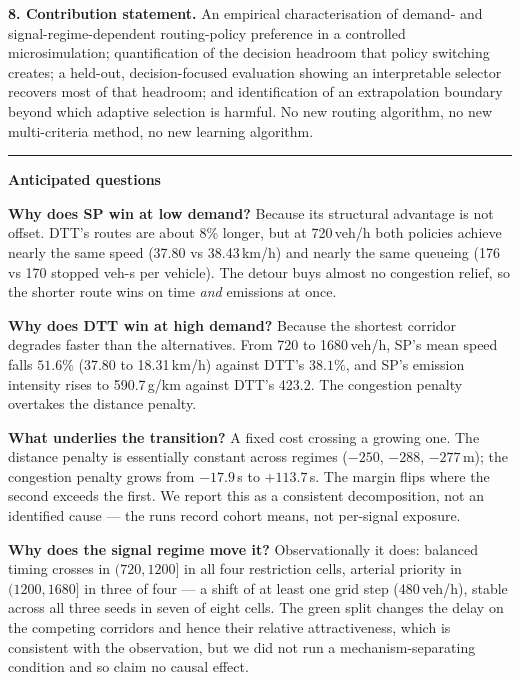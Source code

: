 \documentclass[10pt,a4paper]{article}
\begin{document}
\textbf{8. Contribution statement.}
An empirical characterisation of demand- and signal-regime-dependent routing-policy preference in a controlled microsimulation; quantification of the decision headroom that policy switching creates; a held-out, decision-focused evaluation showing an interpretable selector recovers most of that headroom; and identification of an extrapolation boundary beyond which adaptive selection is harmful. No new routing algorithm, no new multi-criteria method, no new learning algorithm.

\vspace{4pt}\hrule\vspace{4pt}
{\large\bfseries Anticipated questions}\vspace{2pt}

\textbf{Why does SP win at low demand?} Because its structural advantage is not offset. DTT's routes are about 8\% longer, but at 720\,veh/h both policies achieve nearly the same speed (37.80 vs 38.43\,km/h) and nearly the same queueing (176 vs 170 stopped veh-s per vehicle). The detour buys almost no congestion relief, so the shorter route wins on time \emph{and} emissions at once.

\textbf{Why does DTT win at high demand?} Because the shortest corridor degrades faster than the alternatives. From 720 to 1680\,veh/h, SP's mean speed falls $51.6\%$ (37.80 to 18.31\,km/h) against DTT's $38.1\%$, and SP's emission intensity rises to 590.7\,g/km against DTT's 423.2. The congestion penalty overtakes the distance penalty.

\textbf{What underlies the transition?} A fixed cost crossing a growing one. The distance penalty is essentially constant across regimes ($-250$, $-288$, $-277$\,m); the congestion penalty grows from $-17.9$\,s to $+113.7$\,s. The margin flips where the second exceeds the first. We report this as a consistent decomposition, not an identified cause --- the runs record cohort means, not per-signal exposure.

\textbf{Why does the signal regime move it?} Observationally it does: balanced timing crosses in $(720,1200]$ in all four restriction cells, arterial priority in $(1200,1680]$ in three of four --- a shift of at least one grid step (480\,veh/h), stable across all three seeds in seven of eight cells. The green split changes the delay on the competing corridors and hence their relative attractiveness, which is consistent with the observation, but we did not run a mechanism-separating condition and so claim no causal effect.
\end{document}
